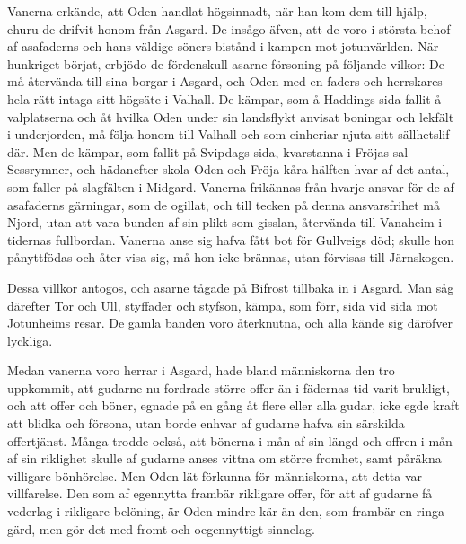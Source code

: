 Vanerna erkände, att Oden handlat högsinnadt, när han kom dem till
hjälp, ehuru de drifvit honom från Asgard. De insågo äfven, att de voro
i största behof af asafaderns och hans väldige söners bistånd i kampen
mot jotunvärlden. När hunkriget börjat, erbjödo de fördenskull asarne
försoning på följande vilkor: De må återvända till sina borgar i Asgard,
och Oden med en faders och herrskares hela rätt intaga sitt högsäte i
Valhall. De kämpar, som å Haddings sida fallit å valplatserna och åt
hvilka Oden under sin landsflykt anvisat boningar och lekfält i
underjorden, må följa honom till Valhall och som einheriar njuta sitt
sällhetslif där. Men de kämpar, som fallit på Svipdags sida, kvarstanna
i Fröjas sal Sessrymner, och hädanefter skola Oden och Fröja kåra
hälften hvar af det antal, som faller på slagfälten i Midgard. Vanerna
frikännas från hvarje ansvar för de af asafaderns gärningar, som de
ogillat, och till tecken på denna ansvarsfrihet må Njord, utan att vara
bunden af sin plikt som gisslan, återvända till Vanaheim i tidernas
fullbordan. Vanerna anse sig hafva fått bot för Gullveigs död; skulle
hon pånyttfödas och åter visa sig, må hon icke brännas, utan förvisas
till Järnskogen.

Dessa villkor antogos, och asarne tågade på Bifrost tillbaka in i
Asgard. Man såg därefter Tor och Ull, styffader och styfson, kämpa, som
förr, sida vid sida mot Jotunheims resar. De gamla banden voro
återknutna, och alla kände sig däröfver lyckliga.

Medan vanerna voro herrar i Asgard, hade bland människorna den tro
uppkommit, att gudarne nu fordrade större offer än i fädernas tid varit
brukligt, och att offer och böner, egnade på en gång åt flere eller alla
gudar, icke egde kraft att blidka och försona, utan borde enhvar af
gudarne hafva sin särskilda offertjänst. Många trodde också, att bönerna
i mån af sin längd och offren i mån af sin riklighet skulle af gudarne
anses vittna om större fromhet, samt påräkna villigare bönhörelse. Men
Oden lät förkunna för människorna, att detta var villfarelse. Den som af
egennytta frambär rikligare offer, för att af gudarne få vederlag i
rikligare belöning, är Oden mindre kär än den, som frambär en ringa
gärd, men gör det med fromt och oegennyttigt sinnelag.

